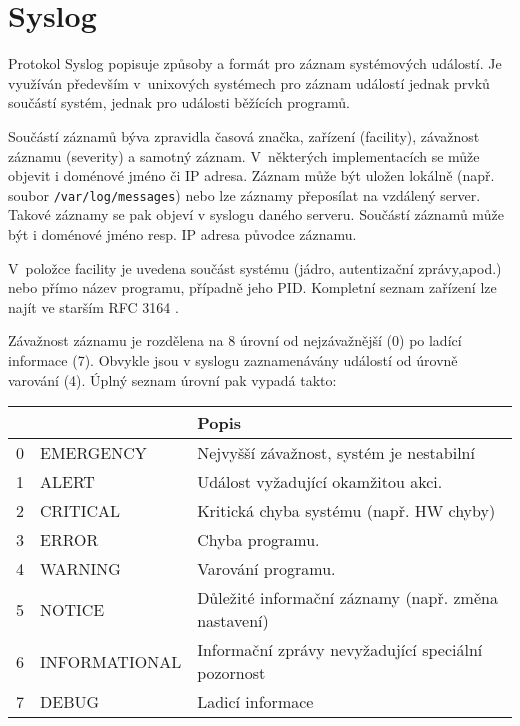 \section{Syslog}
\label{syslog}

Protokol Syslog \cite{rfc5424} popisuje způsoby a formát pro záznam systémových událostí. Je využíván
 především v~unixových systémech pro záznam událostí jednak prvků součástí systém, jednak pro
 události běžících programů. 

Součástí záznamů býva zpravidla časová značka, zařízení (facility), závažnost záznamu (severity)
 a samotný záznam. V~některých implementacích se může objevit i doménové jméno či IP adresa. Záznam
 může být uložen lokálně (např. soubor \verb|/var/log/messages|) nebo lze záznamy přeposílat
 na vzdálený server. Takové záznamy se pak objeví v syslogu daného serveru. Součástí záznamů může být
 i doménové jméno resp. IP adresa původce záznamu.

V~položce facility je uvedena součást systému (jádro, autentizační zprávy,apod.) nebo
 přímo název programu, případně jeho PID. Kompletní seznam zařízení lze najít ve starším RFC 3164
 \cite{rfc3164}.

Závažnost záznamu je rozdělena na 8 úrovní od nejzávažnější (0) po ladící informace (7). Obvykle
 jsou v syslogu zaznamenávány událostí od úrovně varování (4). Úplný seznam úrovní pak vypadá takto:
\begin{table}[!h]
	\centering
	\begin{tabular}[!h]{|c|l|l|}
	\hline
	\shortstack{Závažnost} & & Popis \\
	\hline
	0 & EMERGENCY & Nejvyšší závažnost, systém je nestabilní\\
	1 & ALERT & Událost vyžadující okamžitou akci.\\
	2 & CRITICAL & Kritická chyba systému (např. HW chyby) \\
	3 & ERROR & Chyba programu.\\
	4 & WARNING & Varování programu.\\
	5 & NOTICE & Důležité informační záznamy (např. změna nastavení)\\
	6 & INFORMATIONAL & Informační zprávy nevyžadující speciální pozornost\\
	7 & DEBUG & Ladicí informace\\
	\hline
	\end{tabular}
\end{table}


\newpage
